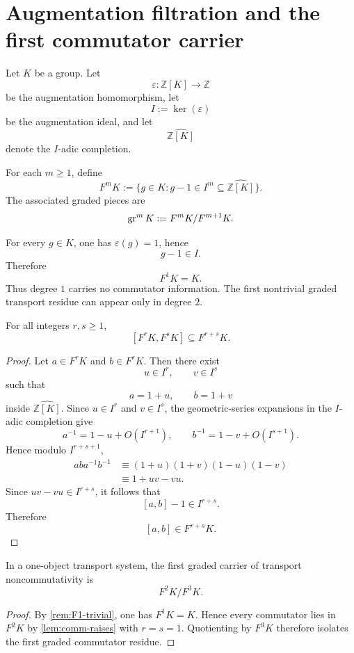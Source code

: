 \section{Augmentation filtration and the first commutator carrier}
Let \(K\) be a group.  Let
\[
	\varepsilon:\mathbb Z[K]\to \mathbb Z
\]
be the augmentation homomorphism, let
\[
	I:=\ker(\varepsilon)
\]
be the augmentation ideal, and let
\[
	\widehat{\mathbb Z[K]}
\]
denote the \(I\)-adic completion.
\begin{definition}
	For each \(m\ge 1\), define
	\[
		F^mK
		:=
		\{g\in K: g-1\in I^m\subseteq \widehat{\mathbb Z[K]}\}.
	\]
	The associated graded pieces are
	\[
		\operatorname{gr}^m K:=F^mK/F^{m+1}K.
	\]
\end{definition}
\begin{remark}
	\label{rem:F1-trivial}
	For every \(g\in K\), one has \(\varepsilon(g)=1\), hence
	\[
		g-1\in I.
	\]
	Therefore
	\[
		F^1K=K.
	\]
	Thus degree \(1\) carries no commutator information.  The first
	nontrivial graded transport residue can appear only in degree \(2\).
\end{remark}
\begin{lemma}
	\label{lem:comm-raises}
	For all integers \(r,s\ge 1\),
	\[
		[F^rK,F^sK]\subseteq F^{r+s}K.
	\]
\end{lemma}
\begin{proof}
	Let \(a\in F^rK\) and \(b\in F^sK\).  Then there exist
	\[
		u\in I^r,\qquad v\in I^s
	\]
	such that
	\[
		a=1+u,\qquad b=1+v
	\]
	inside \(\widehat{\mathbb Z[K]}\).
	Since \(u\in I^r\) and \(v\in I^s\), the geometric-series expansions in
	the \(I\)-adic completion give
	\[
		a^{-1}=1-u+O(I^{r+1}),
		\qquad
		b^{-1}=1-v+O(I^{s+1}).
	\]
	Hence modulo \(I^{r+s+1}\),
	\begin{align*}
		aba^{-1}b^{-1}
		 & \equiv
		(1+u)(1+v)(1-u)(1-v) \\
		 & \equiv
		1+uv-vu.
	\end{align*}
	Since \(uv-vu\in I^{r+s}\), it follows that
	\[
		[a,b]-1\in I^{r+s}.
	\]
	Therefore
	\[
		[a,b]\in F^{r+s}K.
	\]
\end{proof}
\begin{corollary}
	\label{cor:first-visible-comm}
	In a one-object transport system, the first graded carrier of transport
	noncommutativity is
	\[
		F^2K/F^3K.
	\]
\end{corollary}
\begin{proof}
	By \cref{rem:F1-trivial}, one has \(F^1K=K\).  Hence every commutator
	lies in \(F^2K\) by \cref{lem:comm-raises} with \(r=s=1\).  Quotienting
	by \(F^3K\) therefore isolates the first graded commutator residue.
\end{proof}
